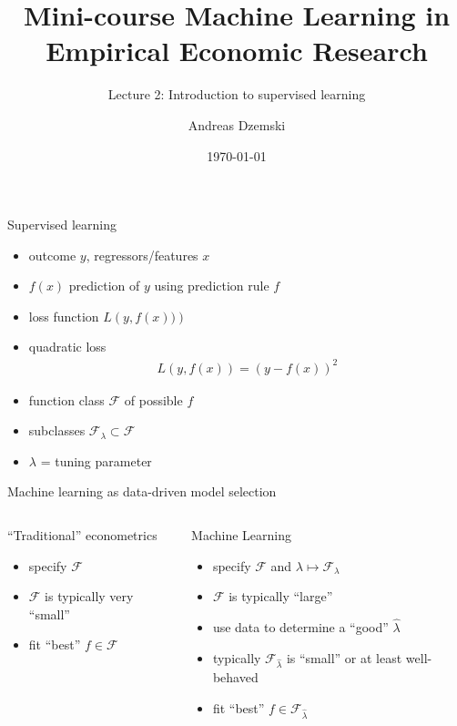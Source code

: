 \documentclass[xcolor=dvipsnames, handout]{beamer}
\author[Dzemski]{Andreas Dzemski\inst{1}}
\institute{\inst{1} University of Gothenburg}
\title{Mini-course Machine Learning in Empirical Economic Research}
\subtitle{Lecture 2: Introduction to supervised learning}
\date{\today}
\begin{document}
\maketitle

\begin{frame}{Supervised learning}
\begin{itemize}
    \item outcome $y$, regressors/features $x$
    \item $f(x)$ prediction of $y$ using prediction rule $f$
    \item loss function $L\left(y, f(x))\right)$
    \item quadratic loss
    \begin{align*}
      L\left(y, f(x)\right) =  \left(y - f(x) \right)^2 
    \end{align*}
    \item function class $\mathcal{F}$ of possible $f$
    \item subclasses $\mathcal{F}_{\lambda} \subset \mathcal{F}$
    \item $\lambda$ = tuning parameter
  \end{itemize}  
\end{frame}

\begin{frame}{Machine learning as data-driven model selection}
\begin{columns}[t, onlytextwidth]
        \begin{block}{``Traditional'' econometrics}
        \begin{itemize}
          \item 
          specify $\mathcal{F}$
          \item 
          $\mathcal{F}$ is typically very ``small''
          \item 
          fit ``best'' $f \in \mathcal{F}$
        \end{itemize}
        \end{block}
        \begin{block}{Machine Learning}
        \begin{itemize}
          \item 
          specify $\mathcal{F}$ and $\lambda \mapsto \mathcal{F}_{\lambda}$
          \item 
          $\mathcal{F}$ is typically ``large''
          \item 
          use data to determine a ``good'' $\hat{\lambda}$
          \item
          typically $\mathcal{F}_{\hat{\lambda}}$ is ``small'' or at least well-behaved
          \item 
          fit ``best'' $f \in \mathcal{F}_{\hat{\lambda}}$
        \end{itemize}
      \end{block}
\end{columns}
\end{frame}
\end{document}
